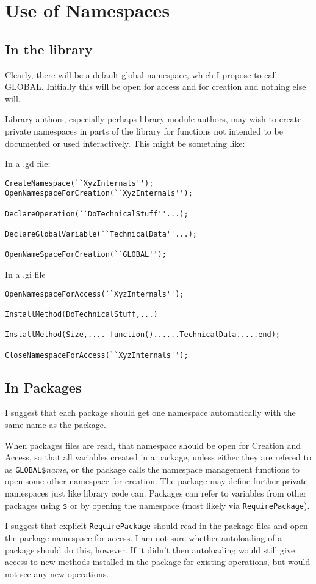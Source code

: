 \documentclass{article}
\begin{document}
\section{Use of Namespaces}

\subsection{In the library}

Clearly, there will be a default global namespace, which I propose to
call GLOBAL. Initially this will be open for access and for creation
and nothing else will.

Library authors, especially perhaps library module authors, may wish
to create private namespaces in parts of the library for functions not
intended to be documented or used interactively. This might be
something like:


In a .gd file:
\begin{verbatim}
CreateNamespace(``XyzInternals'');
OpenNamespaceForCreation(``XyzInternals'');

DeclareOperation(``DoTechnicalStuff''...);

DeclareGlobalVariable(``TechnicalData''...);

OpenNameSpaceForCreation(``GLOBAL'');
\end{verbatim}

In a .gi file
\begin{verbatim}
OpenNamespaceForAccess(``XyzInternals'');

InstallMethod(DoTechnicalStuff,...)

InstallMethod(Size,.... function()......TechnicalData.....end);

CloseNamespaceForAccess(``XyzInternals'');
\end{verbatim}

\subsection{In Packages}

I suggest that each package should get one namespace automatically
with the same name as the package. 

When packages files are read, that namespace should be open for
Creation and Access, so that all variables created in a package,
unless either they are refered to as \verb|GLOBAL$|\textit{name}, or
the package calls the namespace management functions to open some
other namespace for creation. The package may define further private
namespaces just like library code can. Packages can refer to variables
from other packages using \verb|$| or by opening the namespace (most
likely via \verb|RequirePackage|).

I suggest that explicit \verb|RequirePackage| should read in the
package files and open the package namespace for access. I am not sure
whether autoloading of a package should do this, however. If it didn't
then autoloading would still give access to new methods installed in
the package for existing operations, but would not see any new
operations.
\end{document}
